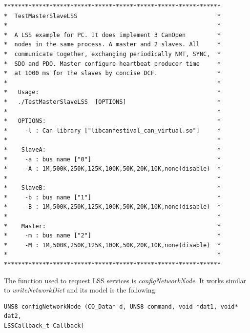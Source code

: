 \documentclass[12pt,english,a4paper]{book}
\begin{document}
\begin{verbatim}
**************************************************************
*  TestMasterSlaveLSS                                        *
*                                                            *
*  A LSS example for PC. It does implement 3 CanOpen         *
*  nodes in the same process. A master and 2 slaves. All     *
*  communicate together, exchanging periodically NMT, SYNC,  *
*  SDO and PDO. Master configure heartbeat producer time     *
*  at 1000 ms for the slaves by concise DCF.                 *
*                                                            *
*   Usage:                                                   *
*   ./TestMasterSlaveLSS  [OPTIONS]                          *
*                                                            *
*   OPTIONS:                                                 *
*     -l : Can library ["libcanfestival_can_virtual.so"]     *
*                                                            *
*    SlaveA:                                                 *
*     -a : bus name ["0"]                                    *
*     -A : 1M,500K,250K,125K,100K,50K,20K,10K,none(disable)  *
*                                                            *
*    SlaveB:                                                 *
*     -b : bus name ["1"]                                    *
*     -B : 1M,500K,250K,125K,100K,50K,20K,10K,none(disable)  *
*                                                            *
*    Master:                                                 *
*     -m : bus name ["2"]                                    *
*     -M : 1M,500K,250K,125K,100K,50K,20K,10K,none(disable)  *
*                                                            *
**************************************************************
\end{verbatim}

The function used to request LSS services is \textit{configNetworkNode}. It works similar to \textit{writeNetworkDict} and its model is the following:
\begin{verbatim}
UNS8 configNetworkNode (CO_Data* d, UNS8 command, void *dat1, void* dat2, 
LSSCallback_t Callback)
\end{verbatim}
\end{document}
